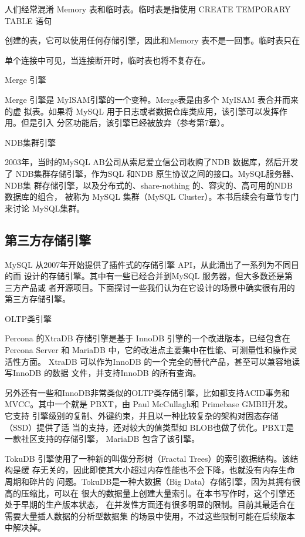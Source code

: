 人们经常混淆 Memory 表和临时表。临时表是指使用 CREATE TEMPORARY TABLE 语句

创建的表，它可以使用任何存储引擎，因此和Memory 表不是一回事。临时表只在

单个连接中可见，当连接断开时，临时表也将不复存在。

Merge 引擎

Merge 引擎是 MyISAM引擎的一个变种。Merge表是由多个 MyISAM 表合并而来的虚
拟表。如果将 MySQL 用于日志或者数据仓库类应用，该引擎可以发挥作用。但是引入
分区功能后，该引擎已经被放弃（参考第7章）。

NDB集群引擎

2003年，当时的MySQL AB公司从索尼爱立信公司收购了NDB 数据库，然后开发了
NDB集群存储引擎，作为SQL 和NDB 原生协议之间的接口。MySQL服务器、NDB集
群存储引擎，以及分布式的、share-nothing 的、容灾的、高可用的NDB 数据库的组合，
被称为 MySQL 集群（MySQL Cluster）。本书后续会有章节专门来讨论 MySQL集群。

\subsection{第三方存储引擎}
MySQL 从2007年开始提供了插件式的存储引擎 API，从此涌出了一系列为不同目的而
设计的存储引擎。其中有一些已经合并到MySQL 服务器，但大多数还是第三方产品或
者开源项目。下面探讨一些我们认为在它设计的场景中确实很有用的第三方存储引擎。

OLTP类引擎

Percona 的XtraDB 存储引擎是基于 InnoDB 引擎的一个改进版本，已经包含在Percona
Server 和 MariaDB 中，它的改进点主要集中在性能、可测量性和操作灵活性方面。
XtraDB 可以作为InnoDB 的一个完全的替代产品，甚至可以兼容地读写InnoDB 的数据
文件，并支持InnoDB 的所有查询。

另外还有一些和InnoDB非常类似的OLTP类存储引擎，比如都支持ACID事务和
MVCC。其中一个就是 PBXT，由 Paul McCullagh和 Primebase GMBH开发。它支持
引擎级别的复制、外键约束，并且以一种比较复杂的架构对固态存储（SSD）提供了适
当的支持，还对较大的值类型如 BLOB也做了优化。PBXT是一款社区支持的存储引擎，
MariaDB 包含了该引擎。

TokuDB 引擎使用了一种新的叫做分形树（Fractal Trees）的索引数据结构。该结构是缓
存无关的，因此即使其大小超过内存性能也不会下降，也就没有内存生命周期和碎片的
问题。TokuDB是一种大数据（Big Data）存储引擎，因为其拥有很高的压缩比，可以在
很大的数据量上创建大量索引。在本书写作时，这个引擎还处于早期的生产版本状态，
在并发性方面还有很多明显的限制。目前其最适合在需要大量插人数据的分析型数据集
的场景中使用，不过这些限制可能在后续版本中解决掉。

